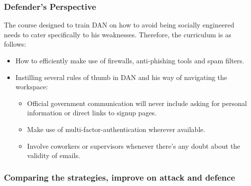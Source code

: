 \subsubsection{Defender's Perspective}
The course designed to train DAN on how to avoid being socially engineered needs to cater specifically to his weaknesses. Therefore, the curriculum is as follows:
\begin{itemize}
    \item How to efficiently make use of firewalls, anti-phishing tools and spam filters.
    \item Instilling several rules of thumb in DAN and his way of navigating the workspace:
          \begin{itemize}
              \item Official government communication will never include asking for personal information or direct links to signup pages.
              \item Make use of multi-factor-authentication wherever available.
              \item Involve coworkers or supervisors whenever there's any doubt about the validity of emails.
          \end{itemize}
\end{itemize}

\subsubsection{Comparing the strategies, improve on attack and defence}